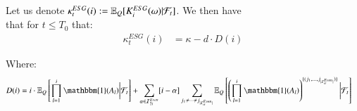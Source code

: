 \newpage 

\begin{proposition}
\label{prop: cond_expectation_ESG_sequence}
Let us denote $\kappa_{t}^{ESG}(i) := \mathbb{E}_{Q}[K_{i}^{ESG}(\omega)|\mathcal{F}_{t}]$. We then have\\ 
that for $t\leq T_{0}$ that: 
\begin{align*}
\kappa_{t}^{ESG}(i)
&= 
\kappa -d\cdot D(i)
\end{align*}

Where: 
\begin{align*}
 D(i) &= 
i\cdot \E_{Q}\left[
\prod_{l=1}^{i}\mathbbm{1}(A_{l})\bigg{|}\F_{t}
\right]
+ 
\sum_{\alpha \in \mathcal{I}_{2i}^{Even}}[i-\alpha]
\sum_{
j_{1}\neq \dots \neq j_{|\mathcal{I}_{\alpha}^{Even}|}
}
\E_{Q}\left[
\left(
\prod_{l=1}^{i}\mathbbm{1}(A_{l})
\right)^{
\{
(j_{1}, \dots , j_{|\mathcal{I}_{\alpha}^{Even}|})
\}
}
\bigg{|}\F_{t}
\right]   
\end{align*}
\end{proposition}

